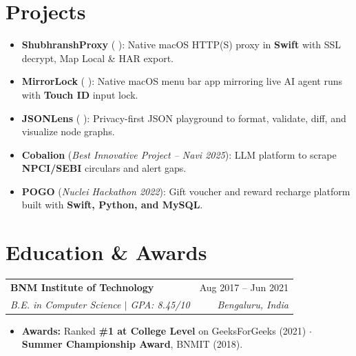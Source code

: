 \documentclass[a4paper,10pt]{article}
\makeatletter
\newcommand{\resumeSubheading}[4]{
  \vspace{4pt}
  \begin{tabular*}{\textwidth}{l@{\extracolsep{\fill}}r}
    \textbf{#1} & \small #2 \\
    \textit{\small #3} & \textit{\small #4} \\
  \end{tabular*}
  \vspace{-5pt}
}
\newcommand{\resumeItemListStart}{\begin{itemize}[leftmargin=0.16in, itemsep=1.8pt, topsep=2.5pt, parsep=0pt]\small}
\newcommand{\resumeItemListEnd}{\end{itemize}\vspace{-2pt}}
\makeatother
\begin{document}
\section{Projects}
\vspace{2pt}
\resumeItemListStart
\item \textbf{ShubhranshProxy} (\href{https://shubhransh-gupta.github.io/ShubhranshProxy/}{\faGlobe} \href{https://github.com/shubhransh-gupta/ShubhranshProxy}{\faGithub}): Native macOS HTTP(S) proxy in \textbf{Swift} with SSL decrypt, Map Local \& HAR export.
\item \textbf{MirrorLock} (\href{https://shubhransh-gupta.github.io/mirrorLock}{\faGlobe} \href{https://github.com/shubhransh-gupta/mirrorLock}{\faGithub}): Native macOS menu bar app mirroring live AI agent runs with \textbf{Touch ID} input lock.
\item \textbf{JSONLens} (\href{https://shubhransh-gupta.github.io/jsonlens/}{\faGlobe} \href{https://github.com/shubhransh-gupta/jsonlens}{\faGithub}): Privacy-first JSON playground to format, validate, diff, and visualize node graphs.
\item \textbf{Cobalion} (\textit{Best Innovative Project -- Navi 2025}): LLM platform to scrape \textbf{NPCI/SEBI} circulars and alert gaps.
\item \textbf{POGO} (\textit{Nuclei Hackathon 2022}): Gift voucher and reward recharge platform built with \textbf{Swift, Python, and MySQL}.
\resumeItemListEnd

\section{Education \& Awards}

\resumeSubheading
{BNM Institute of Technology}{Aug 2017 -- Jun 2021}
{B.E. in Computer Science \enspace $|$ \enspace GPA: 8.45/10}{Bengaluru, India}
\resumeItemListStart
\item \textbf{Awards:} Ranked \textbf{\#1 at College Level} on GeeksForGeeks (2021) \enspace $\cdot$ \enspace \textbf{Summer Championship Award}, BNMIT (2018).
\resumeItemListEnd
\end{document}
